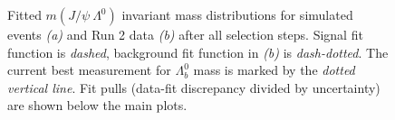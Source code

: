 \begin{figure}[t]
\begin{subfigure}{.45\textwidth}
		\caption{}
	\end{subfigure}
	\caption{Fitted $m(J/\psi~\Lambda^0)$ invariant mass distributions for simulated \demonstratorshort events \textit{(a)} and Run 2 data \textit{(b)} after all selection steps. Signal fit function is \textit{dashed}, background fit function in \textit{(b)} is \textit{dash-dotted}. The current best measurement for $\Lambda_b^0$ mass is marked by the \textit{dotted vertical line}. Fit pulls (data-fit discrepancy divided by uncertainty) are shown below the main plots.}
\end{figure}
